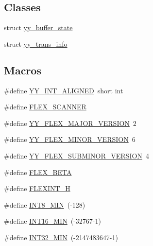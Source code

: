 \subsection*{Classes}
\begin{DoxyCompactItemize}
\item 
struct \hyperlink{structyy__buffer__state}{yy\-\_\-buffer\-\_\-state}
\item 
struct \hyperlink{structyy__trans__info}{yy\-\_\-trans\-\_\-info}
\end{DoxyCompactItemize}
\subsection*{Macros}
\begin{DoxyCompactItemize}
\item 
\#define \hyperlink{_genesys_09_09-scanner_8cpp_a1ae16e642a197fa4948998525813c6f5}{Y\-Y\-\_\-\-I\-N\-T\-\_\-\-A\-L\-I\-G\-N\-E\-D}~short int
\item 
\#define \hyperlink{_genesys_09_09-scanner_8cpp_a3c3d1ef92e93b0bc81d7760a73d5c3b6}{F\-L\-E\-X\-\_\-\-S\-C\-A\-N\-N\-E\-R}
\item 
\#define \hyperlink{_genesys_09_09-scanner_8cpp_a243ca1d30872935faf05ea5118ed6fdc}{Y\-Y\-\_\-\-F\-L\-E\-X\-\_\-\-M\-A\-J\-O\-R\-\_\-\-V\-E\-R\-S\-I\-O\-N}~2
\item 
\#define \hyperlink{_genesys_09_09-scanner_8cpp_a90f9d458829400869e47efb68a865677}{Y\-Y\-\_\-\-F\-L\-E\-X\-\_\-\-M\-I\-N\-O\-R\-\_\-\-V\-E\-R\-S\-I\-O\-N}~6
\item 
\#define \hyperlink{_genesys_09_09-scanner_8cpp_ac676bd06869180ea493e9b6d7c078dbb}{Y\-Y\-\_\-\-F\-L\-E\-X\-\_\-\-S\-U\-B\-M\-I\-N\-O\-R\-\_\-\-V\-E\-R\-S\-I\-O\-N}~4
\item 
\#define \hyperlink{_genesys_09_09-scanner_8cpp_a9465c9986fdda27730c9dff8d16a0887}{F\-L\-E\-X\-\_\-\-B\-E\-T\-A}
\item 
\#define \hyperlink{_genesys_09_09-scanner_8cpp_aec980b5a71bbe6d67931df20f0ebaec4}{F\-L\-E\-X\-I\-N\-T\-\_\-\-H}
\item 
\#define \hyperlink{_genesys_09_09-scanner_8cpp_aadcf2a81af243df333b31efa6461ab8e}{I\-N\-T8\-\_\-\-M\-I\-N}~(-\/128)
\item 
\#define \hyperlink{_genesys_09_09-scanner_8cpp_ad4e9955955b27624963643eac448118a}{I\-N\-T16\-\_\-\-M\-I\-N}~(-\/32767-\/1)
\item 
\#define \hyperlink{_genesys_09_09-scanner_8cpp_a688eb21a22db27c2b2bd5836943cdcbe}{I\-N\-T32\-\_\-\-M\-I\-N}~(-\/2147483647-\/1)

\end{DoxyCompactItemize}
